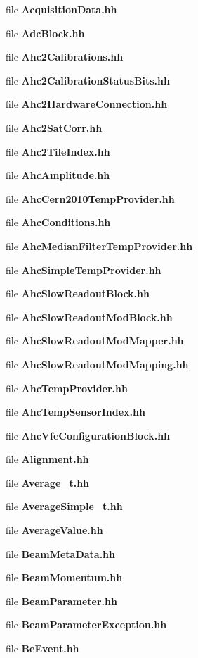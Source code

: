 \begin{DoxyCompactItemize}
\item 
file {\bfseries Acquisition\-Data.\-hh}
\item 
file {\bfseries Adc\-Block.\-hh}
\item 
file {\bfseries Ahc2\-Calibrations.\-hh}
\item 
file {\bfseries Ahc2\-Calibration\-Status\-Bits.\-hh}
\item 
file {\bfseries Ahc2\-Hardware\-Connection.\-hh}
\item 
file {\bfseries Ahc2\-Sat\-Corr.\-hh}
\item 
file {\bfseries Ahc2\-Tile\-Index.\-hh}
\item 
file {\bfseries Ahc\-Amplitude.\-hh}
\item 
file {\bfseries Ahc\-Cern2010\-Temp\-Provider.\-hh}
\item 
file {\bfseries Ahc\-Conditions.\-hh}
\item 
file {\bfseries Ahc\-Median\-Filter\-Temp\-Provider.\-hh}
\item 
file {\bfseries Ahc\-Simple\-Temp\-Provider.\-hh}
\item 
file {\bfseries Ahc\-Slow\-Readout\-Block.\-hh}
\item 
file {\bfseries Ahc\-Slow\-Readout\-Mod\-Block.\-hh}
\item 
file {\bfseries Ahc\-Slow\-Readout\-Mod\-Mapper.\-hh}
\item 
file {\bfseries Ahc\-Slow\-Readout\-Mod\-Mapping.\-hh}
\item 
file {\bfseries Ahc\-Temp\-Provider.\-hh}
\item 
file {\bfseries Ahc\-Temp\-Sensor\-Index.\-hh}
\item 
file {\bfseries Ahc\-Vfe\-Configuration\-Block.\-hh}
\item 
file {\bfseries Alignment.\-hh}
\item 
file {\bfseries Average\-\_\-t.\-hh}
\item 
file {\bfseries Average\-Simple\-\_\-t.\-hh}
\item 
file {\bfseries Average\-Value.\-hh}
\item 
file {\bfseries Beam\-Meta\-Data.\-hh}
\item 
file {\bfseries Beam\-Momentum.\-hh}
\item 
file {\bfseries Beam\-Parameter.\-hh}
\item 
file {\bfseries Beam\-Parameter\-Exception.\-hh}
\item 
file {\bfseries Be\-Event.\-hh}

\end{DoxyCompactItemize}
